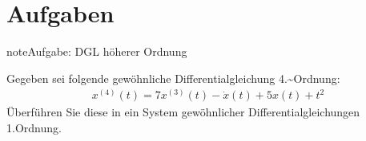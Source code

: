 \documentclass[letterpaper,10pt,english]{jupyterBook}
\begin{document}
\section{Aufgaben}
\label{\detokenize{ode/ex:aufgaben}}\label{\detokenize{ode/ex::doc}}
\begin{sphinxadmonition}{note}{Aufgabe: DGL höherer Ordnung}

\sphinxAtStartPar
Gegeben sei folgende gewöhnliche Differentialgleichung 4.\textasciitilde{}Ordnung:
\begin{equation*}
\begin{split}x^{(4)}(t) = 7 x^{(3)}(t) - \dot x(t) + 5 x(t) + t^2\end{split}
\end{equation*}
\sphinxAtStartPar
Überführen Sie diese in ein System gewöhnlicher Differentialgleichungen 1.Ordnung.
\end{sphinxadmonition}
\end{document}
